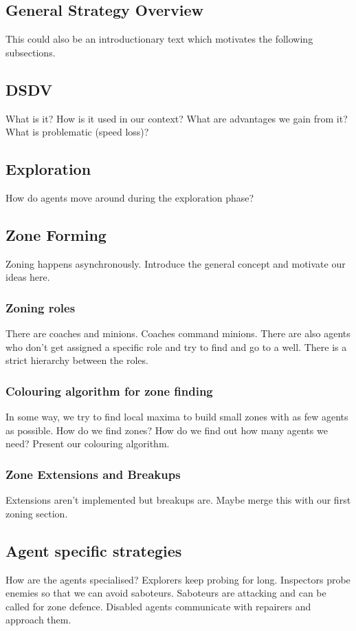 \subsection{General Strategy Overview}
This could also be an introductionary text which motivates the following subsections.
\subsection{DSDV}
What is it? How is it used in our context? What are advantages we gain from it? What is problematic (speed loss)?
\subsection{Exploration}
How do agents move around during the exploration phase?
\subsection{Zone Forming}
Zoning happens asynchronously. Introduce the general concept and motivate our ideas here.
\subsubsection{Zoning roles}
There are coaches and minions. Coaches command minions. There are also agents who don't get assigned a specific role and try to find and go to a well. There is a strict hierarchy between the roles.
\subsubsection{Colouring algorithm for zone finding}
In some way, we try to find local maxima to build small zones with as few agents as possible. How do we find zones? How do we find out how many agents we need? Present our colouring algorithm.
\subsubsection{Zone Extensions and Breakups}
Extensions aren't implemented but breakups are. Maybe merge this with our first zoning section.
\subsection{Agent specific strategies}
How are the agents specialised? Explorers keep probing for long. Inspectors probe enemies so that we can avoid saboteurs. Saboteurs are attacking and can be called for zone defence. Disabled agents communicate with repairers and approach them.
